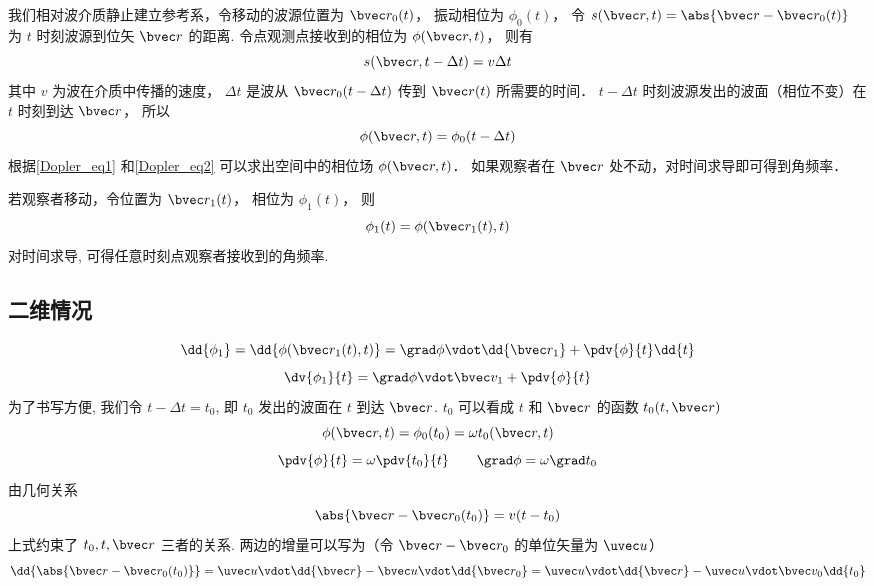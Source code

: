 

我们相对波介质静止建立参考系，令移动的波源位置为 $\bvec r_0(t)$， 振动相位为 $\phi_0(t)$， 令 $s(\bvec r, t) = \abs{\bvec r - \bvec r_0(t)}$ 为 $t$ 时刻波源到位矢 $\bvec r$ 的距离. 令点观测点接收到的相位为 $\phi(\bvec r, t)$， 则有
\begin{equation}\label{Dopler_eq1}
s(\bvec r, t - \Delta t) = v\Delta t
\end{equation}
其中 $v$ 为波在介质中传播的速度， $\Delta t$ 是波从 $\bvec r_0(t - \Delta t)$ 传到 $\bvec r(t)$ 所需要的时间． $t - \Delta t$ 时刻波源发出的波面（相位不变）在 $t$ 时刻到达 $\bvec r$， 所以
\begin{equation}\label{Dopler_eq2}
\phi(\bvec r, t) = \phi_0(t - \Delta t)
\end{equation}
根据\autoref{Dopler_eq1} 和\autoref{Dopler_eq2} 可以求出空间中的相位场 $\phi(\bvec r, t)$． 如果观察者在 $\bvec r$ 处不动，对时间求导即可得到角频率．

若观察者移动，令位置为 $\bvec r_1(t)$， 相位为 $\phi_1(t)$， 则
\begin{equation}
\phi_1(t) = \phi(\bvec r_1(t), t)
\end{equation}
对时间求导, 可得任意时刻点观察者接收到的角频率.


\subsection{二维情况}
\begin{equation}
\dd{\phi_1} = \dd{\phi(\bvec r_1(t), t)} = \grad \phi \vdot \dd{\bvec r_1} + \pdv{\phi}{t}\dd{t}
\end{equation}
\begin{equation}
\dv{\phi_1}{t} = \grad\phi \vdot \bvec v_1 + \pdv{\phi}{t}
\end{equation}
为了书写方便, 我们令 $t - \Delta t = t_0$, 即 $t_0$ 发出的波面在 $t$ 到达 $\bvec r$. $t_0$ 可以看成 $t$ 和 $\bvec r$ 的函数  $t_0(t, \bvec r)$
\begin{equation}
\phi(\bvec r, t) =  \phi_0(t_0) = \omega t_0(\bvec r, t)
\end{equation}
\begin{equation}
\pdv{\phi}{t} = \omega \pdv{t_0}{t} \qquad
\grad \phi = \omega \grad t_0
\end{equation}
由几何关系
\begin{equation}
\abs{\bvec r - \bvec r_0(t_0)} = v(t - t_0)
\end{equation}
上式约束了 $t_0, t, \bvec r$ 三者的关系. 两边的增量可以写为（令 $\bvec r - \bvec r_0$ 的单位矢量为 $\uvec u$）
\begin{equation}
\dd{\abs{\bvec r - \bvec r_0(t_0)}} = \uvec u \vdot \dd{\bvec r} - \bvec u \vdot \dd{\bvec r_0} = \uvec u \vdot \dd{\bvec r} - \uvec u \vdot \bvec v_0 \dd{t_0}
\end{equation}

